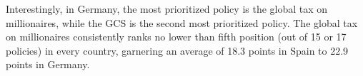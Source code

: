 \begin{bibunit}
Interestingly, in Germany, the most prioritized policy is the global tax on millionaires, while the GCS is the second most prioritized policy. The global tax on millionaires consistently ranks no lower than fifth position (out of 15 or 17 policies) in every country, garnering an average of 18.3 points in Spain to 22.9 points in Germany.



  



\end{bibunit}
